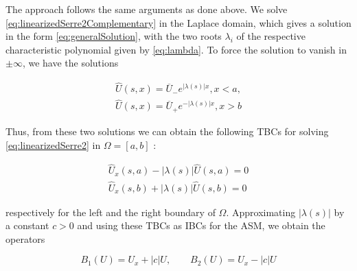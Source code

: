 \indent The approach follows the same arguments as done above. We solve \eqref{eq:linearizedSerre2Complementary} in the Laplace domain, which gives a solution in the form \eqref{eq:generalSolution}, with the two roots $\lambda_i$ of the respective characteristic polynomial given by \eqref{eq:lambda}. To force the solution to vanish in $\pm \infty$, we have the solutions

\begin{gather*}
\hat{U}(s,x) = \overline{U}_-e^{|\lambda(s)|x}, x < a, \\
\hat{U}(s,x) = \overline{U}_+e^{-|\lambda(s)|x}, x > b
\end{gather*}

\indent Thus, from these two solutions we can obtain the following TBCs for solving \eqref{eq:linearizedSerre2} in $\Omega=[a,b]$ :

\begin{gather*}
\hat{U}_x(s,a) - |\lambda(s)|\hat{U}(s,a) = 0 \\
\hat{U}_x(s,b) + |\lambda(s)|\hat{U}(s,b) = 0
\end{gather*}

\noindent respectively for the left and the right boundary of $\Omega$. Approximating $|\lambda(s)|$ by a constant $c>0$  and using these TBCs as IBCs for the ASM, we obtain the operators

 \begin{equation*}
 	B_1(U) = U_x + |c|U, \qquad B_2(U) = U_x - |c|U
 \end{equation*}
